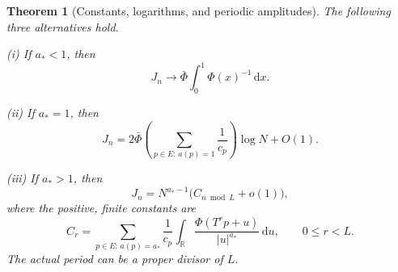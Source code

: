 \documentclass[11pt,a4paper]{article}
\numberwithin{equation}{section}
\newtheorem{theorem}{Theorem}[section]
\theoremstyle{definition}
\theoremstyle{remark}
\newcommand{\RR}{\mathbb R}
\newcommand{\dd}{\,\mathrm d}
\begin{document}
\begin{theorem}[Constants, logarithms, and periodic amplitudes]
\label{thm:amplitudes}
The following three alternatives hold.

\textup{(i)} If $a_*<1$, then
\begin{equation}
 J_n\longrightarrow\bar\Phi\int_0^1\Phi(x)^{-1}\dd x.
 \label{eq:subcritical-amplitude}
\end{equation}

\textup{(ii)} If $a_*=1$, then
\begin{equation}
 J_n=2\bar\Phi\left(\sum_{p\in E:\,a(p)=1}\frac1{c_p}\right)
                      \log N+O(1).
 \label{eq:critical-amplitude}
\end{equation}

\textup{(iii)} If $a_*>1$, then
\begin{equation}
 J_n=N^{a_*-1}\bigl(C_{n\bmod L}+o(1)\bigr),
 \label{eq:supercritical-amplitude}
\end{equation}
where the positive, finite constants are
\begin{equation}
 C_r=\sum_{p\in E:\,a(p)=a_*}\frac1{c_p}
       \int_{\RR}\frac{\Phi(T^rp+u)}{|u|^{a_*}}\dd u,
       \qquad 0\le r<L.
 \label{eq:periodic-constants}
\end{equation}
The actual period can be a proper divisor of $L$.
\end{theorem}
\end{document}
